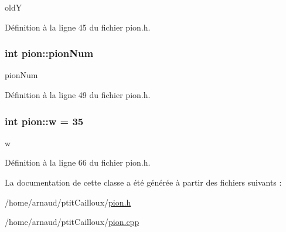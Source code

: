 old\-Y 



Définition à la ligne 45 du fichier pion.\-h.

\hypertarget{classpion_a7338c5dde99c3d415665776d76c2d2db}{
\subsubsection[{pion\-Num}]{\setlength{\rightskip}{0pt plus 5cm}int pion\-::pion\-Num\hspace{0.3cm}{\ttfamily [private]}}}\label{classpion_a7338c5dde99c3d415665776d76c2d2db}


pion\-Num 



Définition à la ligne 49 du fichier pion.\-h.

\hypertarget{classpion_ada2a7530bcff33b54aeb9b082a8d7bdb}{
\subsubsection[{w}]{\setlength{\rightskip}{0pt plus 5cm}int pion\-::w = 35\hspace{0.3cm}{\ttfamily [private]}}}\label{classpion_ada2a7530bcff33b54aeb9b082a8d7bdb}


w 



Définition à la ligne 66 du fichier pion.\-h.



La documentation de cette classe a été générée à partir des fichiers suivants \-:\begin{DoxyCompactItemize}
\item 
/home/arnaud/ptit\-Cailloux/\hyperlink{pion_8h}{pion.\-h}\item 
/home/arnaud/ptit\-Cailloux/\hyperlink{pion_8cpp}{pion.\-cpp}\end{DoxyCompactItemize}
